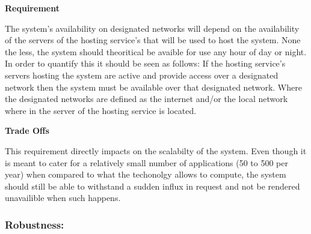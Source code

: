 \begin{flushleft}
\vspace{0.1in}

\textbf{Requirement}

The system's availability on designated networks will depend on the availability of the servers of the hosting service's that will be used to host the system. None the less, the system should theoritical be avaible for use any hour of day or night.\\
In order to quantify this it should be seen as follows: If the hosting service's servers hosting the system are active and provide access over a designated network then the system must be available over that designated network. Where the designated networks are defined as the internet and/or the local network where in the server of the hosting service is located.
\vspace{0.1in}

\textbf{Trade Offs}

This requirement directly impacts on the scalabilty of the system. Even though it is meant to cater for a relatively small number of applications (50 to 500 per year) when compared to what the techonolgy allows to compute, the system should still be able to withstand a sudden influx in request and not be rendered unavailible when such happens.

\vspace{0.1in}
\end{flushleft}
\newpage
\subsubsection{Robustness:}


